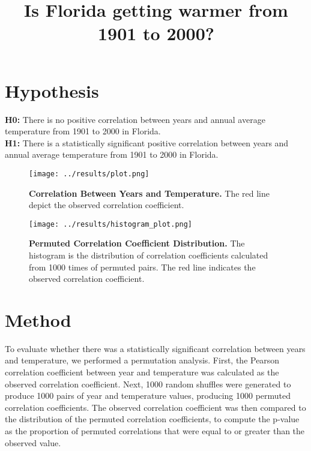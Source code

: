 \documentclass[a4paper]{article}
\title{Is Florida getting warmer from 1901 to 2000?}
\date{} %
\begin{document}
\maketitle

\section*{Hypothesis}
\textbf{H0:} There is no positive correlation between years and annual average temperature from 1901 to 2000 in Florida. \\
\textbf{H1:} There is a statistically significant positive correlation between years and annual average temperature from 1901 to 2000 in Florida.

\begin{figure}[H]
\centering
\begin{minipage}[t]{0.45\textwidth}
    \centering
    \texttt{[image: ../results/plot.png]}
    \caption{\textbf{Correlation Between Years and Temperature.} The red line depict the observed correlation coefficient.}
    \label{fig:scatterplot}
\end{minipage}
\hfill
\begin{minipage}[t]{0.45\textwidth}
    \centering
    \texttt{[image: ../results/histogram\_plot.png]}
    \caption{\textbf{Permuted Correlation Coefficient Distribution.} The histogram is the distribution of correlation coefficients calculated from 1000 times of permuted pairs. The red line indicates the observed correlation coefficient. }
    \label{fig:floridaplots}
    \label{fig:histogram}
\end{minipage}
\end{figure}



\section*{Method}
To evaluate whether there was a statistically significant correlation between years and temperature, we performed a permutation analysis. First, the Pearson correlation coefficient between year and temperature was calculated as the observed correlation coefficient. Next, 1000 random shuffles were generated to produce 1000 pairs of year and temperature values, producing 1000 permuted correlation coefficients. The observed correlation coefficient was then compared to the distribution of the permuted correlation coefficients, to compute the p-value as the proportion of permuted correlations that were equal to or greater than the observed value.
\end{document}
